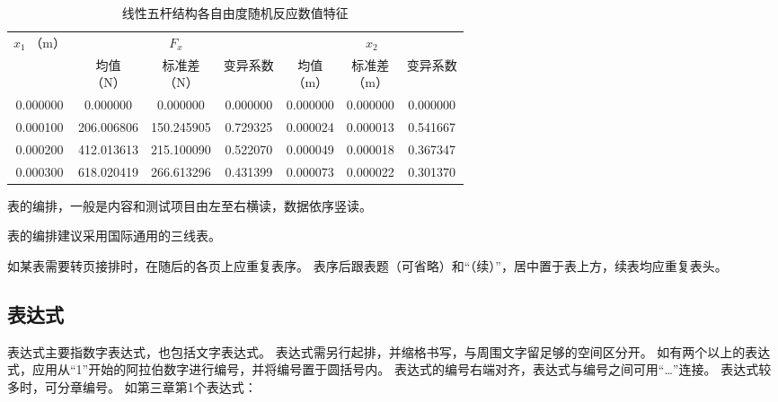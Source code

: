 \begin{table}[H]
    \centering
    \caption{线性五杆结构各自由度随机反应数值特征}
    \label{tab:example}
    \begin{tabular}{c|c|c|c|c|c|c}
        \hline
        \multirowcell{2}[-7pt][c]{$x_{1}$                                                \\（m）} & \multicolumn{3}{c|}{$F_{x}$} & \multicolumn{3}{c}{$x_{2}$}                                             \\
        \cline{2-7}
                 & \makecell{均值                                                          \\（N）}                        & \makecell{标准差\\（N）}                      & 变异系数     & \makecell{均值\\（m）}    & \makecell{标准差\\（m）}   & 变异系数     \\
        \hline
        0.000000 & 0.000000     & 0.000000   & 0.000000 & 0.000000 & 0.000000 & 0.000000 \\
        0.000100 & 206.006806   & 150.245905 & 0.729325 & 0.000024 & 0.000013 & 0.541667 \\
        0.000200 & 412.013613   & 215.100090 & 0.522070 & 0.000049 & 0.000018 & 0.367347 \\
        0.000300 & 618.020419   & 266.613296 & 0.431399 & 0.000073 & 0.000022 & 0.301370 \\
        \hline
    \end{tabular}
\end{table}

表的编排，一般是内容和测试项目由左至右横读，数据依序竖读。

表的编排建议采用国际通用的三线表。

如某表需要转页接排时，在随后的各页上应重复表序。
表序后跟表题（可省略）和“（续）”，居中置于表上方，续表均应重复表头。

\subsection{表达式}

表达式主要指数字表达式，也包括文字表达式。
表达式需另行起排，并缩格书写，与周围文字留足够的空间区分开。
如有两个以上的表达式，应用从“1”开始的阿拉伯数字进行编号，并将编号置于圆括号内。
表达式的编号右端对齐，表达式与编号之间可用“…”连接。
表达式较多时，可分章编号。
如第三章第1个表达式：

